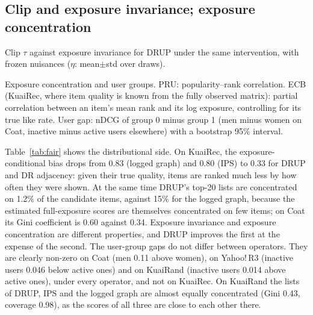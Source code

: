 \documentclass[preprint,review,12pt,authoryear]{elsarticle}
\theoremstyle{definition}
\begin{document}
\subsection{Clip and exposure invariance; exposure concentration}\label{sec:fairsupp}
\begin{table}[t]\centering\small
\caption{Clip $\tau$ against exposure invariance for DRUP under the same
intervention, with frozen nuisances ($\eta$: mean$\pm$std over draws).}\label{tab:tau}
\begin{adjustbox}{max width=\textwidth}

\end{adjustbox}
\end{table}

\begin{table}[t]\centering\small
\caption{Exposure concentration and user groups. PRU: popularity--rank
correlation. ECB (KuaiRec, where item quality is known from the fully observed
matrix): partial correlation between an item's mean rank and its log exposure,
controlling for its true like rate. User gap: nDCG of group 0 minus group 1
(men minus women on Coat, inactive minus active users elsewhere) with a
bootstrap 95\% interval.}\label{tab:fair}
\begin{adjustbox}{max width=\textwidth}

\end{adjustbox}
\end{table}

Table~\ref{tab:fair} shows the distributional side. On KuaiRec, the
exposure-conditional bias drops from 0.83 (logged graph) and 0.80 (IPS) to 0.33
for DRUP and DR adjacency: given their true quality, items are ranked much less
by how often they were shown. At the same time DRUP's top-20 lists are
concentrated on 1.2\% of the candidate items, against 15\% for the logged graph,
because the estimated full-exposure scores are themselves concentrated on few items; on Coat its Gini
coefficient is 0.60 against 0.34. Exposure invariance and exposure concentration
are different properties, and DRUP improves the first at the expense of the
second. The user-group gaps do not differ between operators. They are clearly
non-zero on Coat (men 0.11 above women), on Yahoo!\,R3 (inactive users 0.046
below active ones) and on KuaiRand (inactive users 0.014 above active ones), under every
operator, and not on KuaiRec. On KuaiRand the lists of DRUP, IPS and the logged graph
are almost equally concentrated (Gini 0.43, coverage 0.98), as the scores of all
three are close to each other there.
\end{document}
